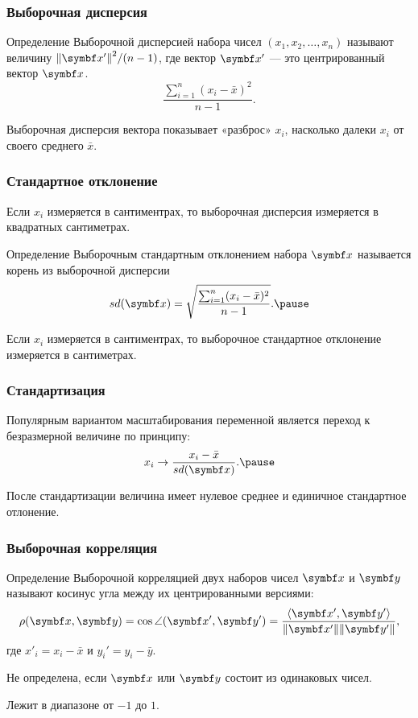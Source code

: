 \begin{frame}
  \frametitle{Выборочная дисперсия}

  \begin{block}{Определение}
    \alert{Выборочной дисперсией} набора чисел $(x_1, x_2, \ldots, x_n)$ 
    называют величину $\norm{\bx'}^2 / (n-1)$, где вектор $\bx'$ — это 
    центрированный вектор $\bx$. 
    \[
    \frac{\sum_{i=1}^n(x_i - \bar x)^2}{n-1}.  
    \]
    \pause
  \end{block}

  Выборочная дисперсия вектора показывает «разброс» $x_i$, 
  насколько далеки $x_i$ от своего среднего $\bar x$.
  

\end{frame}


\begin{frame}
  \frametitle{Стандартное отклонение}

  Если $x_i$ измеряется в сантиментрах, 
  то выборочная дисперсия измеряется в квадратных сантиметрах. \pause

  \begin{block}{Определение}
    \alert{Выборочным стандартным отклонением} набора $\bx$ называется 
    корень из выборочной дисперсии 
    \[
      sd(\bx) = \sqrt{\frac{\sum_{i=1}^n(x_i - \bar x)^2}{n-1}}. \pause
    \]
  \end{block}

  \pause 
  Если $x_i$ измеряется в сантиментрах, 
  то выборочное стандартное отклонение измеряется в  сантиметрах. 
  

\end{frame}

\begin{frame}
  \frametitle{Стандартизация}

  Популярным вариантом масштабирования переменной является переход к безразмерной 
  величине по принципу:
  \[
  x_i  \to \frac{x_i - \bar x}{sd(\bx)}.  \pause
  \]

  После стандартизации величина имеет нулевое среднее и единичное стандартное отлонение.


\end{frame}


\begin{frame}
  \frametitle{Выборочная корреляция}

  \begin{block}{Определение}
    \alert{Выборочной корреляцией} двух наборов чисел $\bx$ и $\by$
    называют косинус угла между их центрированными версиями:
    \[
    \rho(\bx, \by) = \cos \angle (\bx', \by') = \frac{\langle \bx', \by' \rangle}{\norm{\bx'} \norm{\by'}},   
    \]
    где $x'_i = x_i - \bar x$ и $y_i' = y_i - \bar y$. \pause
  \end{block}

Не определена, если $\bx$ или $\by$ состоит из одинаковых чисел. \pause
 
Лежит в диапазоне от $-1$ до $1$. 

\end{frame}


